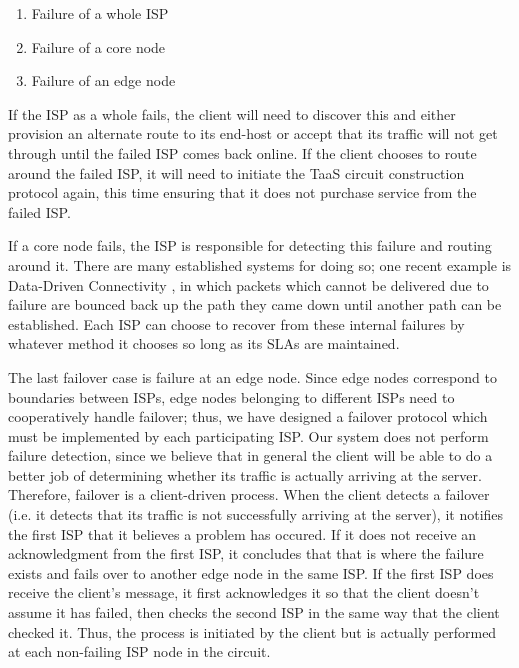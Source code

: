 \documentclass{article}
\begin{document}
\begin{enumerate}
\item Failure of a whole ISP
\item Failure of a core node
\item Failure of an edge node
\end{enumerate}

If the ISP as a whole fails, the client will need to discover this and
either provision an alternate route to its end-host or accept that its
traffic will not get through until the failed ISP comes back
online. If the client chooses to route around the failed ISP, it will
need to initiate the TaaS circuit construction protocol again, this
time ensuring that it does not purchase service from the failed ISP.

If a core node fails, the ISP is responsible for detecting this
failure and routing around it. There are many established systems for
doing so; one recent example is Data-Driven Connectivity \cite{ddc},
in which packets which cannot be delivered due to failure are bounced
back up the path they came down until another path can be
established. Each ISP can choose to recover from these internal
failures by whatever method it chooses so long as its SLAs are
maintained.

The last failover case is failure at an edge node. Since edge nodes
correspond to boundaries between ISPs, edge nodes belonging to
different ISPs need to cooperatively handle failover; thus, we have
designed a failover protocol which must be implemented by each
participating ISP.  Our system does not perform failure detection,
since we believe that in general the client will be able to do a
better job of determining whether its traffic is actually arriving at
the server. Therefore, failover is a client-driven process. When the
client detects a failover (i.e. it detects that its traffic is not
successfully arriving at the server), it notifies the first ISP that
it believes a problem has occured. If it does not receive an
acknowledgment from the first ISP, it concludes that that is where the
failure exists and fails over to another edge node in the same ISP. If
the first ISP does receive the client's message, it first acknowledges
it so that the client doesn't assume it has failed, then checks the
second ISP in the same way that the client checked it. Thus, the
process is initiated by the client but is actually performed at each
non-failing ISP node in the circuit.
\end{document}
